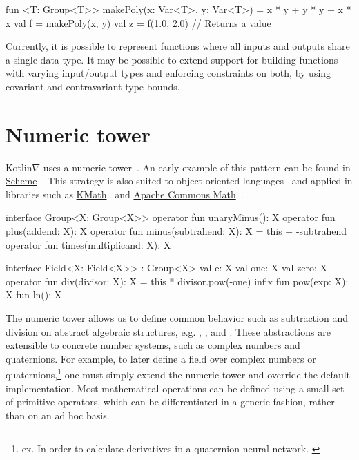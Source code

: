 \begin{kotlinlisting}
fun <T: Group<T>> makePoly(x: Var<T>, y: Var<T>) = x * y + y * y + x * x
val f = makePoly(x, y)
val z = f(1.0, 2.0) // Returns a value
\end{kotlinlisting}
%
Currently, it is possible to represent functions where all inputs and outputs share a single data type. It may be possible to extend support for building functions with varying input/output types and enforcing constraints on both, by using covariant and contravariant type bounds.

\section{Numeric tower}\label{sec:numeric-tower}

Kotlin$\nabla$ uses a numeric tower~\citep{st2012typing}. An early example of this pattern can be found in \href{https://www.gnu.org/software/guile/manual/html_node/Numerical-Tower.html}{Scheme}~\citep{sperber2009revised}. This strategy is also suited to object oriented languages~\citep{niculescu2003design, niculescu2011using, kennedy2005generalized} and applied in libraries such as \href{https://github.com/mipt-npm/kmath}{KMath}~\citep{nozik2019kmath} and \href{https://commons.apache.org/proper/commons-math/}{Apache Commons Math}~\citep{developers2012apache}.

\begin{kotlinlisting}
interface Group<X: Group<X>> {
    operator fun unaryMinus(): X
    operator fun plus(addend: X): X
    operator fun minus(subtrahend: X): X = this + -subtrahend
    operator fun times(multiplicand: X): X
}

interface Field<X: Field<X>> : Group<X> {
    val e: X
    val one: X
    val zero: X
    operator fun div(divisor: X): X = this * divisor.pow(-one)
    infix fun pow(exp: X): X
    fun ln(): X
}
\end{kotlinlisting}
%
The numeric tower allows us to define common behavior such as subtraction and division on abstract algebraic structures, e.g. , , and . These abstractions are extensible to concrete number systems, such as complex numbers and quaternions. For example, to later define a field over complex numbers or quaternions,\hspace{-.08em}\footnote{ex. In order to calculate derivatives in a quaternion neural network. \citep{isokawa2003quaternion}} one must simply extend the numeric tower and override the default implementation. Most mathematical operations can be defined using a small set of primitive operators, which can be differentiated in a generic fashion, rather than on an ad hoc basis.

